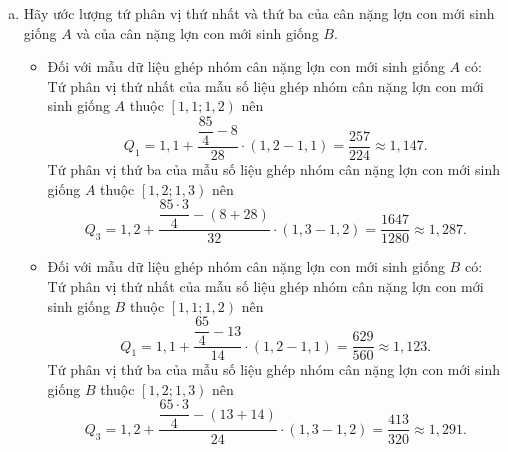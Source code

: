 \begin{bt}
{\begin{enumerate}[a)]
			Suy ra trung vị của mẫu số liệu ghép nhóm cân nặng của của lợn con  giống  $ A $ bằng trung vị của mẫu số liệu ghép nhóm cân nặng của của lợn con  giống $ B $.
			\item Hãy ước lượng tứ phân vị thứ nhất và thứ ba của cân nặng lợn con mới sinh giống $ A $ và của cân nặng lợn con mới sinh giống $ B $.
			\begin{itemize}
				\item Đối với mẫu dữ liệu ghép nhóm cân nặng lợn con mới sinh giống $ A $ có:\\
				Tứ phân vị thứ nhất của mẫu số liệu ghép nhóm cân nặng lợn con mới sinh giống $ A $ thuộc $ \left[ 1{,}1 ; 1{,}2\right)  $ nên $$ Q_1= 1{,}1+\dfrac{\dfrac{85}{4}-8}{28}\cdot \left( 1{,}2-1{,}1\right)= \dfrac{257}{224}\approx 1{,}147.$$
				Tứ phân vị thứ ba của mẫu số liệu ghép nhóm cân nặng lợn con mới sinh giống $ A $ thuộc $ \left[ 1{,}2 ; 1{,}3\right)  $ nên $$ Q_3= 1{,}2+\dfrac{\dfrac{85\cdot3 }{4}-(8+28)}{32}\cdot \left( 1{,}3-1{,}2\right)= \dfrac{1647}{1280}\approx 1{,}287.$$
				\item Đối với mẫu dữ liệu ghép nhóm cân nặng lợn con mới sinh giống $ B $ có:\\
				Tứ phân vị thứ nhất của mẫu số liệu ghép nhóm cân nặng lợn con mới sinh giống $ B $ thuộc $ \left[ 1{,}1 ; 1{,}2\right)  $ nên $$ Q_1= 1{,}1+\dfrac{\dfrac{65}{4}-13}{14}\cdot \left( 1{,}2-1{,}1\right)= \dfrac{629}{560}\approx 1{,}123.$$	
				Tứ phân vị thứ ba của mẫu số liệu ghép nhóm cân nặng lợn con mới sinh giống $ B $ thuộc $ \left[ 1{,}2 ; 1{,}3\right)  $ nên $$ Q_3= 1{,}2+\dfrac{\dfrac{65\cdot 3}{4}-(13+14)}{24}\cdot \left( 1{,}3-1{,}2\right)= \dfrac{413}{320}\approx 1{,}291.$$	
			\end{itemize}
		\end{enumerate}		
	}
\end{bt}

